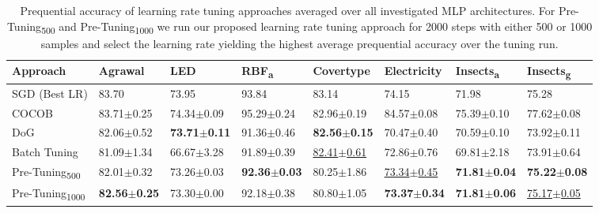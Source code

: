 \documentclass{article} %
\begin{document}
\begin{table}[ht]
   \centering
   \small
   \caption{
      Prequential accuracy of learning rate tuning approaches averaged over all investigated MLP architectures. For Pre-Tuning\textsubscript{500} and Pre-Tuning\textsubscript{1000} we run our proposed learning rate tuning approach for 2000 steps with either 500 or 1000 samples and select the learning rate yielding the highest average prequential accuracy over the tuning run.
   }\label{tab:lr_tuning}
   \begin{tabular}{llllllll}
      \toprule
      Approach                       & Agrawal                  & LED                      & RBF\textsubscript{a}     & Covertype                  & Electricity                & Insects\textsubscript{a} & Insects\textsubscript{g}   \\
      \midrule
      SGD (Best LR)                  & 83.70                    & 73.95                    & 93.84                    & 83.14                      & 74.15                      & 71.98                    & 75.28                      \\
      COCOB                          & 83.71$\pm$0.25           & 74.34$\pm$0.09           & 95.29$\pm$0.24           & 82.96$\pm$0.19             & 84.57$\pm$0.08             & 75.39$\pm$0.10           & 77.62$\pm$0.08             \\ \midrule
      DoG                            & 82.06$\pm$0.52           & \bfseries 73.71$\pm$0.11 & 91.36$\pm$0.46           & \bfseries 82.56$\pm$0.15   & 70.47$\pm$0.40             & 70.59$\pm$0.10           & 73.92$\pm$0.11             \\
      Batch Tuning                   & 81.09$\pm$1.34           & 66.67$\pm$3.28           & 91.89$\pm$0.39           & \underline{82.41$\pm$0.61} & 72.86$\pm$0.76             & 69.81$\pm$2.18           & 73.91$\pm$0.64             \\
      Pre-Tuning\textsubscript{500}  & 82.01$\pm$0.32           & 73.26$\pm$0.03           & \bfseries 92.36$\pm$0.03 & 80.25$\pm$1.86             & \underline{73.34$\pm$0.45} & \bfseries 71.81$\pm$0.04 & \bfseries 75.22$\pm$0.08   \\
      Pre-Tuning\textsubscript{1000} & \bfseries 82.56$\pm$0.25 & 73.30$\pm$0.00           & 92.18$\pm$0.38           & 80.80$\pm$1.05             & \bfseries 73.37$\pm$0.34   & \bfseries 71.81$\pm$0.06 & \underline{75.17$\pm$0.05} \\
      \bottomrule
   \end{tabular}
\end{table}
\end{document}
